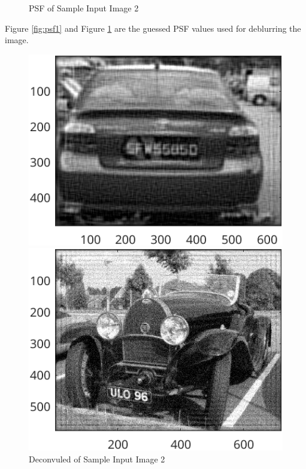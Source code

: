 \documentclass{article}
\begin{document}
\begin{itemize}
\begin{figure}[ht]
\begin{minipage}[t]{0.40\textwidth}
    			\caption{PSF of Sample Input Image 2}
    			\label{fig:psf2}
  			\end{minipage}
			\end{figure}

			Figure {\ref{fig:psf1}} and Figure {\ref{fig:psf2}} are the guessed PSF values used for deblurring the image. 

			\begin{figure}[ht]
  			\centering
  			\begin{minipage}[t]{0.40\textwidth}
    			\centering
    			\includegraphics[width=\textwidth]{2AE1K0.01}
    			\caption{Deconvuled of Sample Input Image 1}
    			\label{fig:deblur1}
  			\end{minipage}\hfill
  			\begin{minipage}[t]{0.40\textwidth}
    			\centering
    			\includegraphics[width=\textwidth]{2AE2K0.01}
    			\caption{Deconvuled of Sample Input Image 2}
    			\label{fig:deblur2}
  			\end{minipage}
			\end{figure}


\end{itemize}
\end{document}
